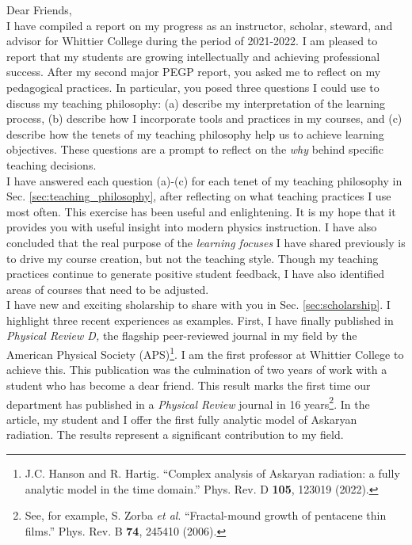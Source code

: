 \documentclass[../../main.tex]{subfiles}
\begin{document}
Dear Friends,
\\
\vspace{0.15cm}
I have compiled a report on my progress as an instructor, scholar, steward, and advisor for Whittier College during the period of 2021-2022.  I am pleased to report that my students are growing intellectually and achieving professional success.  After my second major PEGP report, you asked me to reflect on my pedagogical practices.  In particular, you posed three questions I could use to discuss my teaching philosophy: (a) describe my interpretation of the learning process, (b) describe how I incorporate tools and practices in my courses, and (c) describe how the tenets of my teaching philosophy help us to achieve learning objectives.  These questions are a prompt to reflect on the \textit{why} behind specific teaching decisions.
\\
\vspace{0.15cm}
I have answered each question (a)-(c) for each tenet of my teaching philosophy in Sec. \ref{sec:teaching_philosophy}, after reflecting on what teaching practices I use most often.  This exercise has been useful and enlightening.  It is my hope that it provides you with useful insight into modern physics instruction.  I have also concluded that the real purpose of the \textit{learning focuses} I have shared previously is to drive my course creation, but not the teaching style.  Though my teaching practices continue to generate positive student feedback, I have also identified areas of courses that need to be adjusted.
\\
\vspace{0.15cm}
I have new and exciting sholarship to share with you in Sec. \ref{sec:scholarship}.  I highlight three recent experiences as examples.  First, I have finally published in \textit{Physical Review D,} the flagship peer-reviewed journal in my field by the American Physical Society (APS)\footnote{J.C. Hanson and R. Hartig. ``Complex analysis of Askaryan radiation: a fully analytic model in the time domain.'' Phys. Rev. D \textbf{105}, 123019 (2022).}.  I am the first professor at Whittier College to achieve this.  This publication was the culmination of two years of work with a student who has become a dear friend.  This result marks the first time our department has published in a \textit{Physical Review} journal in 16 years\footnote{See, for example, S. Zorba \textit{et al}. ``Fractal-mound growth of pentacene thin films.'' Phys. Rev. B \textbf{74}, 245410 (2006).}.  In the article, my student and I offer the first fully analytic model of Askaryan radiation.  The results represent a significant contribution to my field.
\end{document}
